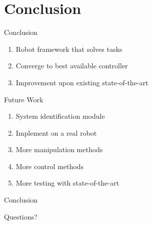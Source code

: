 \section{Conclusion}

\begin{frame}[fragile]{Conclusion}
  \begin{block}{}
  \begin{enumerate}
    \item Robot framework that solves tasks\pause
    \item Converge to best available controller\pause
    \item Improvement upon existing state-of-the-art
  \end{enumerate}
  \end{block}
\end{frame}

\begin{frame}[fragile]{Future Work}
  \begin{block}{}
  \begin{enumerate}
    \item System identification module
    \item Implement on a real robot
    \item More manipulation methods
    \item More control methods
    \item More testing with state-of-the-art
  \end{enumerate}
  \end{block}
\end{frame}

\begin{frame}[fragile]{Conclusion}
\begin{center}
    Questions?
\end{center}
\end{frame}
